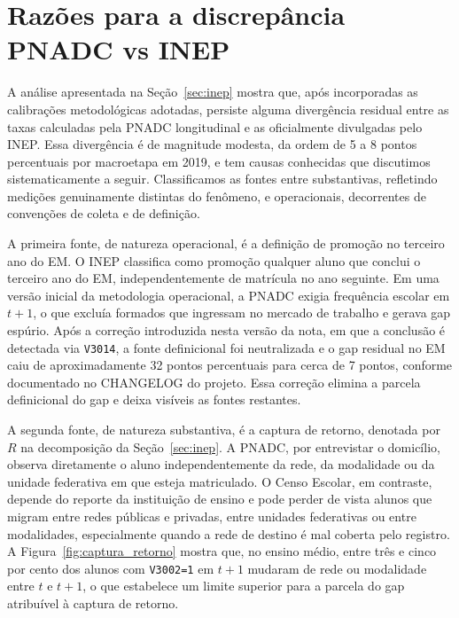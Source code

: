 
\section{Razões para a discrepância PNADC vs INEP}
\label{sec:razoes}

A análise apresentada na Seção~\ref{sec:inep} mostra que, após
incorporadas as calibrações metodológicas adotadas, persiste
alguma divergência residual entre as taxas calculadas pela PNADC
longitudinal e as oficialmente divulgadas pelo INEP. Essa
divergência é de magnitude modesta, da ordem de 5 a 8 pontos
percentuais por macroetapa em 2019, e tem causas conhecidas que
discutimos sistematicamente a seguir. Classificamos as fontes
entre substantivas, refletindo medições genuinamente distintas do
fenômeno, e operacionais, decorrentes de convenções de coleta e
de definição.

A primeira fonte, de natureza operacional, é a definição de
promoção no terceiro ano do EM. O INEP classifica como promoção
qualquer aluno que conclui o terceiro ano do EM, independentemente
de matrícula no ano seguinte. Em uma versão inicial da
metodologia operacional, a PNADC exigia frequência escolar em
$t+1$, o que excluía formados que ingressam no mercado de
trabalho e gerava gap espúrio. Após a correção introduzida nesta
versão da nota, em que a conclusão é detectada via
\texttt{V3014}, a fonte definicional foi neutralizada e o gap
residual no EM caiu de aproximadamente 32 pontos percentuais
para cerca de 7 pontos, conforme documentado no CHANGELOG do
projeto. Essa correção elimina a parcela definicional do gap e
deixa visíveis as fontes restantes.

A segunda fonte, de natureza substantiva, é a captura de
retorno, denotada por $R$ na decomposição da
Seção~\ref{sec:inep}. A PNADC, por entrevistar o domicílio,
observa diretamente o aluno independentemente da rede, da
modalidade ou da unidade federativa em que esteja matriculado.
O Censo Escolar, em contraste, depende do reporte da
instituição de ensino e pode perder de vista alunos que migram
entre redes públicas e privadas, entre unidades federativas ou
entre modalidades, especialmente quando a rede de destino é
mal coberta pelo registro. A Figura~\ref{fig:captura_retorno}
mostra que, no ensino médio, entre três e cinco por cento dos
alunos com \texttt{V3002=1} em $t+1$ mudaram de rede ou
modalidade entre $t$ e $t+1$, o que estabelece um limite
superior para a parcela do gap atribuível à captura de retorno.

